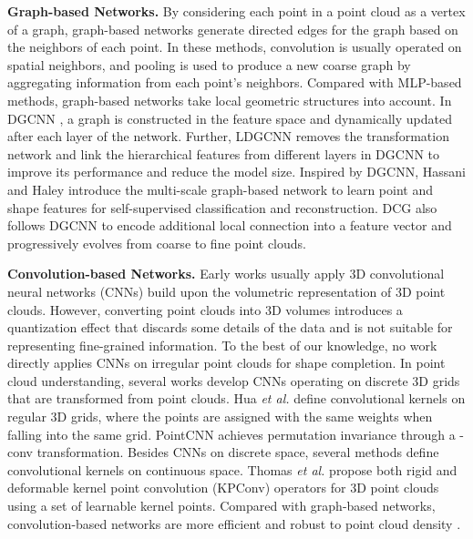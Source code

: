 \documentclass[runningheads]{llncs}
\begin{document}
\noindent \textbf{Graph-based Networks.}
By considering each point in a point cloud as a vertex of a graph, graph-based networks generate directed edges for the graph based on the neighbors of each point.
In these methods, convolution is usually operated on spatial neighbors, and pooling is used to produce a new coarse graph by aggregating information from each point's neighbors.
Compared with MLP-based methods, graph-based networks take local geometric structures into account.
In DGCNN \cite{DBLP:journals/tog/WangSLSBS19}, a graph is constructed in the feature space and dynamically updated after each layer of the network.
Further, LDGCNN \cite{DBLP:journals/arxiv/1904-10014} removes the transformation network and link the hierarchical features from different layers in DGCNN to improve its performance and reduce the model size.
Inspired by DGCNN, Hassani and Haley \cite{DBLP:conf/iccv/HassaniH19} introduce the multi-scale graph-based network to learn point and shape features for self-supervised classification and reconstruction.
DCG \cite{DBLP:conf/ijcai/Wang0J19} also follows DGCNN to encode additional local connection into a feature vector and progressively evolves from coarse to fine point clouds.

\noindent \textbf{Convolution-based Networks.}
Early works \cite{DBLP:conf/cvpr/DaiQN17,DBLP:conf/iccv/HanLHKY17,DBLP:journals/tvcg/LiSWZ17} usually apply 3D convolutional neural networks (CNNs) build upon the volumetric representation of 3D point clouds.
However, converting point clouds into 3D volumes introduces a quantization effect that discards some details of the data \cite{DBLP:journals/tvcg/WangL19} and is not suitable for representing fine-grained information.
To the best of our knowledge, no work directly applies CNNs on irregular point clouds for shape completion.
In point cloud understanding, several works \cite{DBLP:conf/iccv/MaoWL19,DBLP:conf/cvpr/HuaTY18,DBLP:conf/cvpr/LeiAM19,DBLP:conf/cvpr/LanYYD19,DBLP:conf/nips/LiBSWDC18} develop CNNs operating on discrete 3D grids that are transformed from point clouds.
Hua {\it et al.} \cite{DBLP:conf/cvpr/HuaTY18} define convolutional kernels on regular 3D grids, where the points are assigned with the same weights when falling into the same grid.
PointCNN \cite{DBLP:conf/nips/LiBSWDC18} achieves permutation invariance through a -conv transformation.
Besides CNNs on discrete space, several methods \cite{DBLP:conf/nips/LiuTLH19,DBLP:conf/iccv/ThomasQDMGG19,DBLP:conf/cvpr/SuJSMK0K18,DBLP:conf/eccv/XuFXZQ18,DBLP:conf/cvpr/LiuFXP19,DBLP:conf/iccv/LiuFMLXP19,DBLP:conf/cvpr/WuQL19,DBLP:journals/tog/HermosillaRVVR18} define convolutional kernels on continuous space.
Thomas {\it et al.} \cite{DBLP:conf/iccv/ThomasQDMGG19} propose both rigid and deformable kernel point convolution (KPConv) operators for 3D point clouds using a set of learnable kernel points.
Compared with graph-based networks, convolution-based networks are more efficient and robust to point cloud density \cite{DBLP:conf/iccv/MaoWL19}.
\end{document}

